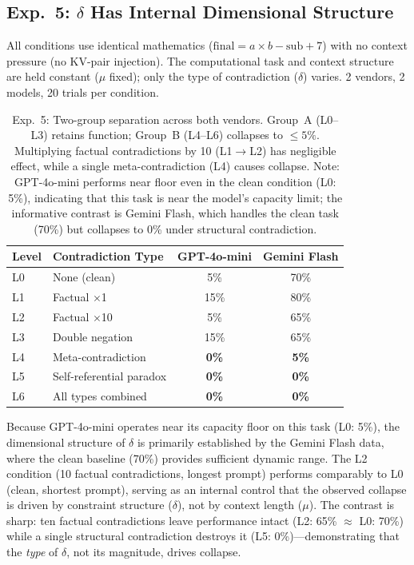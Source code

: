 \documentclass[11pt,a4paper]{article}
\begin{document}
\subsection{Exp.~5: \texorpdfstring{$\delta$}{δ} Has Internal Dimensional Structure}
\label{sec:llm-delta-structure}

All conditions use identical mathematics ($\text{final} = a \times b - \text{sub} + 7$) with no context pressure (no KV-pair injection). The computational task and context structure are held constant ($\mu$ fixed); only the type of contradiction ($\delta$) varies. 2 vendors, 2 models, 20 trials per condition.

\begin{table}[htbp]
\centering
\small
\begin{tabular}{llcc}
\toprule
\textbf{Level} & \textbf{Contradiction Type} & \textbf{GPT-4o-mini} & \textbf{Gemini Flash} \\
\midrule
L0 & None (clean) & 5\% & 70\% \\
L1 & Factual $\times$1 & 15\% & 80\% \\
L2 & Factual $\times$10 & 5\% & 65\% \\
L3 & Double negation & 15\% & 65\% \\
\midrule
L4 & Meta-contradiction & \textbf{0\%} & \textbf{5\%} \\
L5 & Self-referential paradox & \textbf{0\%} & \textbf{0\%} \\
L6 & All types combined & \textbf{0\%} & \textbf{0\%} \\
\bottomrule
\end{tabular}
\caption{Exp.~5: Two-group separation across both vendors. Group~A (L0--L3) retains function; Group~B (L4--L6) collapses to $\leq 5\%$. Multiplying factual contradictions by 10 (L1$\to$L2) has negligible effect, while a single meta-contradiction (L4) causes collapse. Note: GPT-4o-mini performs near floor even in the clean condition (L0: 5\%), indicating that this task is near the model's capacity limit; the informative contrast is Gemini Flash, which handles the clean task (70\%) but collapses to 0\% under structural contradiction.\protect\footnotemark}
\label{tab:exp5}
\end{table}

Because GPT-4o-mini operates near its capacity floor on this task (L0: 5\%), the dimensional structure of $\delta$ is primarily established by the Gemini Flash data, where the clean baseline (70\%) provides sufficient dynamic range. The L2 condition (10 factual contradictions, longest prompt) performs comparably to L0 (clean, shortest prompt), serving as an internal control that the observed collapse is driven by constraint structure ($\delta$), not by context length ($\mu$). The contrast is sharp: ten factual contradictions leave performance intact (L2: 65\% $\approx$ L0: 70\%) while a single structural contradiction destroys it (L5: 0\%)---demonstrating that the \emph{type} of $\delta$, not its magnitude, drives collapse.
\end{document}
